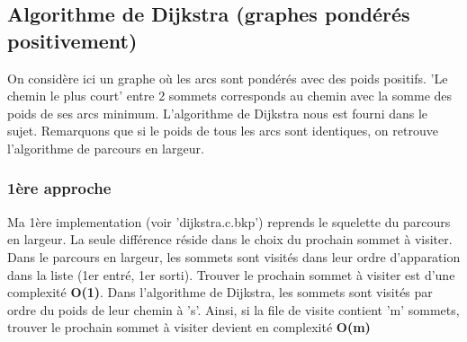 \documentclass[a4paper,10pt]{article}
\begin{document}
  \subsection{Algorithme de Dijkstra (graphes pondérés positivement)}
    On considère ici un graphe où les arcs sont pondérés avec des poids positifs.\newline
    'Le chemin le plus court' entre 2 sommets corresponds au chemin avec la somme des poids de ses arcs minimum.\newline
     L'algorithme de Dijkstra nous est fourni dans le sujet. Remarquons que si le poids de tous les arcs sont identiques,
     on retrouve l'algorithme de parcours en largeur.
    \subsubsection{1ère approche}
      Ma 1ère implementation (voir 'dijkstra.c.bkp') reprends le squelette du parcours en largeur.
      La seule différence réside dans le choix du prochain sommet à visiter.\newline
      Dans le parcours en largeur, les sommets sont visités dans leur ordre d'apparation dans la liste (1er entré, 1er sorti).
      Trouver le prochain sommet à visiter est d'une complexité \textbf{O(1)}.\newline\newline
      Dans l'algorithme de Dijkstra, les sommets sont visités par ordre du poids de leur chemin à 's'.
      Ainsi, si la file de visite contient 'm' sommets, trouver le prochain sommet à visiter devient en complexité \textbf{O(m)}
      
\end{document}

